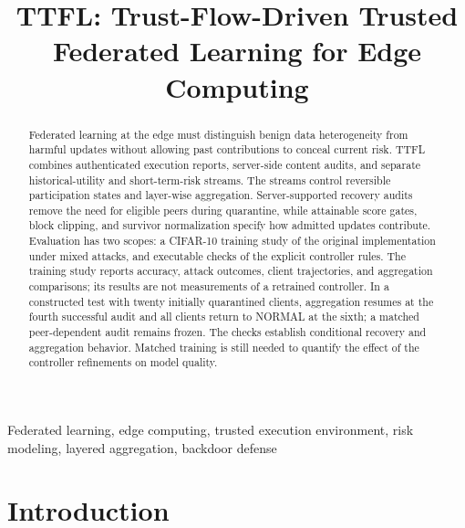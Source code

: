 \documentclass[conference,compsoc]{IEEEtran}
\begin{document}
\title{TTFL: Trust-Flow-Driven Trusted Federated Learning for Edge Computing}

\author{
    }

\maketitle

\begin{abstract}
    Federated learning at the edge must distinguish benign data heterogeneity
    from harmful updates without allowing past contributions to conceal current
    risk. TTFL combines authenticated execution reports, server-side content
    audits, and separate historical-utility and short-term-risk streams. The
    streams control reversible participation states and layer-wise aggregation.
    Server-supported recovery audits remove the need for eligible peers during
    quarantine, while attainable score gates, block clipping, and survivor
    normalization specify how admitted updates contribute. Evaluation has two
    scopes: a CIFAR-10 training study of the original implementation under mixed
    attacks, and executable checks of the explicit controller rules. The training
    study reports accuracy, attack outcomes, client trajectories, and aggregation
    comparisons; its results are not measurements of a retrained controller.
    In a constructed test with twenty initially quarantined clients, aggregation
    resumes at the fourth successful audit and all clients return to NORMAL at
    the sixth; a matched peer-dependent audit remains frozen. The checks establish
    conditional recovery and aggregation behavior. Matched training is still
    needed to quantify the effect of the controller refinements on model quality.
\end{abstract}

\begin{IEEEkeywords}
    Federated learning, edge computing, trusted execution environment, risk modeling, layered aggregation, backdoor defense
\end{IEEEkeywords}

\section{Introduction}
\end{document}
